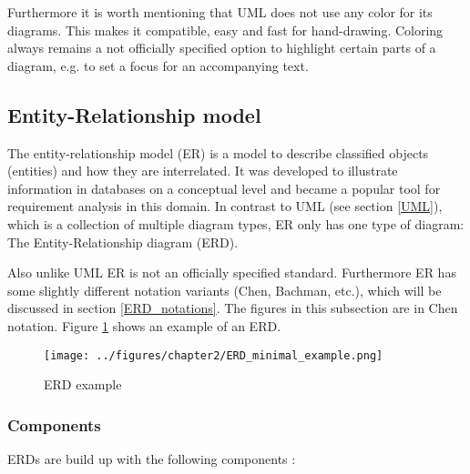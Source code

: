 \documentclass[twoside, openright, 12pt]{book}
\begin{document}
Furthermore it is worth mentioning that UML does not use any color for its diagrams.
This makes it compatible, easy and fast for hand-drawing.
Coloring always remains a not officially specified option to highlight certain parts of a diagram, e.g. to set a focus for an accompanying text.


\subsection{Entity-Relationship model}
\label{ER}
The entity-relationship model (ER) is a model to describe classified objects (entities) and how they are interrelated.
It was developed to illustrate information in databases on a conceptual level and became a popular tool for requirement analysis in this domain.
In contrast to UML (see section \ref{UML}), which is a collection of multiple diagram types, ER only has one type of diagram: The Entity-Relationship diagram (ERD).

Also unlike UML ER is not an officially specified standard.
Furthermore ER has some slightly different notation variants (Chen, Bachman, etc.), which will be discussed in section \ref{ERD_notations}.
The figures in this subsection are in Chen notation.
Figure \ref{fig:ERD_minimal_example} shows an example of an ERD.


\begin{figure}[htb]
	\centering
	\texttt{[image: ../figures/chapter2/ERD\_minimal\_example.png]}
	\caption{ERD example}
	\label{fig:ERD_minimal_example}
\end{figure}

\subsubsection{Components}
ERDs are build up with the following components \citep{Kleuker11}:
\end{document}
